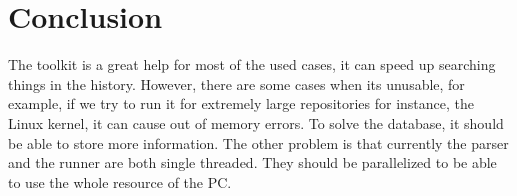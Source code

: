 \chapter{Conclusion}
\label{ch:sum}

The toolkit is a great help for most of the used cases, it can speed up searching things in the history.
However, there are some cases when its unusable, for example, if we try to run it for extremely large repositories
for instance, the Linux kernel, it can cause out of memory errors. To solve the database, it should be able to store more
information. The other problem is that currently the parser and the runner are both single threaded.
They should be parallelized to be able to use the whole resource of the PC.

